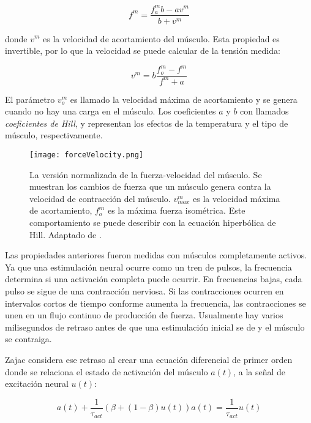 \begin{equation}
	f^m = \frac{f_a^m b -  a v^m}{b + v^m}
\end{equation}

donde $v^m$ es la velocidad de acortamiento del músculo. Esta propiedad es invertible, por lo que la velocidad se puede calcular de la tensión medida:

\begin{equation}
	v^m = b \frac{f_o^m-f^m}{f^m + a}
\end{equation}

El parámetro $v_o^m$ es llamado la velocidad máxima de acortamiento y se genera cuando no hay una carga en el músculo. Los coeficientes $a$ y $b$ con llamados \textit{coeficientes de Hill}, y representan los efectos de la temperatura y el tipo de músculo, respectivamente. 

\begin{figure}[!ht]
	\centering
		\texttt{[image: forceVelocity.png]}
	\caption[Curva de fuerza-velocidad.]{La versión normalizada de la fuerza-velocidad del músculo. Se muestran los cambios de fuerza que un músculo genera contra la velocidad de contracción del músculo. $v_{max}^m$ es la velocidad máxima de acortamiento, $f_o^m$ es la máxima fuerza isométrica. Este comportamiento se puede describir con la ecuación hiperbólica de Hill.  Adaptado de \citep{zajac1989muscle, lee2010survey}.}
	\label{fig:forceVelocity}
\end{figure}

Las propiedades anteriores fueron medidas con músculos completamente activos. Ya que una estimulación neural ocurre como un tren de pulsos, la frecuencia determina si una activación completa puede ocurrir. En frecuencias bajas, cada pulso se sigue de una contracción nerviosa. Si las contracciones ocurren en intervalos cortos de tiempo conforme aumenta la frecuencia, las contracciones se unen en un flujo continuo de producción de fuerza. Usualmente hay varios milisegundos de retraso antes de que una estimulación inicial se de y el músculo se contraiga. 

Zajac \citep{zajac1989muscle} considera ese retraso al crear una ecuación diferencial de primer orden donde se relaciona el estado de activación del músculo $a(t)$, a la señal de excitación neural $u(t)$:

\begin{equation}
	a(t) + \frac{1}{\tau_{act}}(\beta + (1-\beta) u(t)) a(t) = \frac{1}{\tau_{act}} u(t)
\end{equation}

